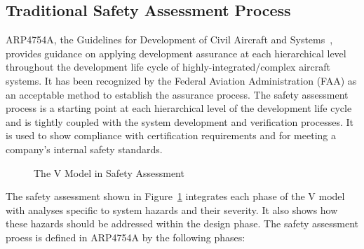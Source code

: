 \subsection{Traditional Safety Assessment Process}
ARP4754A, the Guidelines for Development of Civil Aircraft and Systems~\cite{SAE:ARP4754A}, provides guidance on applying development assurance at each hierarchical level throughout the development life cycle of highly-integrated/complex aircraft systems. It has been recognized by the Federal Aviation Administration (FAA) as an acceptable method to establish the assurance process. The safety assessment process is a starting point at each hierarchical level of the development life cycle and is tightly coupled with the system development and verification processes. It is used to show compliance with certification requirements and for meeting a company's internal safety standards. 

\begin{figure}[!htb]
        \caption{\label{fig:v2} The V Model in Safety Assessment}
\end{figure}

The safety assessment shown in Figure~\ref{fig:v2} integrates each phase of the V model with analyses specific to system hazards and their severity. It also shows how these hazards should be addressed within the design phase. The safety assessment proess is defined in ARP4754A by the following phases:

